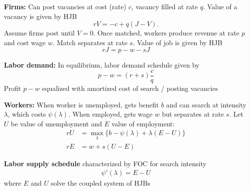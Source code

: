 \documentclass[11pt, aspectratio=169]{beamer}
\begin{document}
\begin{frame}{}

\textbf{Firms:} Can post vacancies at cost (rate) $c$, vacancy filled at rate $q$. Value of a vacancy is given by HJB
\begin{equation*}
	r V = - c + q(J-V).
\end{equation*}
Assume firms post until $V = 0$. Once matched, workers produce revenue at rate $p$ and cost wage $w$. Match separates at rate $s$. Value of job is given by HJB 
\begin{equation*}
	r J = p - w - s J
\end{equation*}

\vspace{5mm}
\textbf{Labor demand:} 
In equilibrium, labor demand schedule given by
\begin{equation*}
	p-w = (r+s) \frac{c}{q}
\end{equation*}
Profit $p-w$ equalized with amortized cost of search / posting vacancies 

\end{frame}

\begin{frame}{}

\textbf{Workers:}
When worker is unemployed, gets benefit $b$ and can search at intensity $\lambda$, which costs $\psi(\lambda)$. When employed, gets wage $w$ but separates at rate $s$. Let $U$ be value of unemployment and $E$ value of employment:
\begin{align*}
	r U &= \max_\lambda \Big\{ b - \psi(\lambda) + \lambda(E - U) \Big\} \\
	r E &= w + s(U - E)
\end{align*}

\vspace{5mm}
\textbf{Labor supply schedule} characterized by FOC for search intensity
\begin{align*}
	\psi'(\lambda) = E - U
\end{align*}
where $E$ and $U$ solve the coupled system of HJBs

\end{frame}
\end{document}
